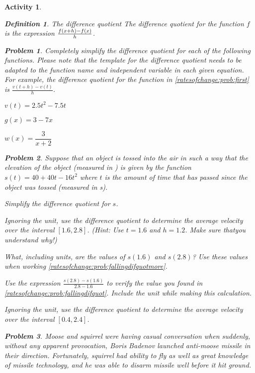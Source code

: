 \documentclass[12pt]{article}
\theoremstyle{activity}
\newtheorem{activity}{Activity}
\theoremstyle{problem}
\newtheorem{problem}{Problem}
\theoremstyle{example}
\theoremstyle{definition}
\newtheorem{definition}{Definition}
\theoremstyle{exercises}
\theoremstyle{exercise}
\begin{document}
\begin{activity}
\begin{definition}{The difference quotient}
The \emph{difference quotient} for the function $f$ is the expression $\frac{f\mleft(x+h\mright)-f(x)}{h}$.
\end{definition}
\begin{problem}
Completely simplify the difference quotient for each of the following functions. Please note that the template for the difference quotient needs to be adapted to the function name and independent variable in each given equation. For example, the difference quotient for the function in \cref{ratesofchange:prob:first} is $\frac{v(t+h)-v(t)}{h}$. 
\begin{parts}
\item \label{ratesofchange:prob:first} $v(t)= 2.5t^2-7.5t$
\item $g(x)=3-7x$
\item $w(x)=\dfrac{3}{x+2}$
\end{parts}
\end{problem}

\begin{problem}
Suppose that an object is tossed into the air in such a way that the elevation of the object (measured in \si{\foot}) is given by the function
$s(t)=40+40t-16t^2$ where $t$ is the amount of time that has passed since the object was tossed (measured in \si{\second}).
\begin{parts}
\item Simplify the difference quotient for $s$.
\item \label{ratesofchange:prob:fallingdifquot} Ignoring the unit, use the difference quotient to determine the average velocity over the interval $[1.6,2.8]$. (Hint: Use $t=1.6$ and
$h=1.2$. Make sure thatyou understand why!) 
\item What, \emph{including units}, are the values of $s(1.6)$ and $s(2.8)$? Use these values when working \cref{ratesofchange:prob:fallingdifquotmore}.
\item \label{ratesofchange:prob:fallingdifquotmore} Use the expression $\frac{s(2.8)-s(1.6)}{2.8-1.6}$ to verify the value you found in \cref{ratesofchange:prob:fallingdifquot}. \emph{Include the unit while making this calculation.}
\item Ignoring the unit, use the difference quotient to determine the average velocity over the interval $[0.4,2.4]$.
\end{parts}
\end{problem}

\begin{problem}
Moose and squirrel were having casual conversation when suddenly, without any apparent provocation, Boris Badenov launched anti-moose missile in their direction. Fortunately, squirrel had ability to fly as well as great knowledge of missile technology, and he was able to disarm missile well before it hit ground. 


\end{problem}
\end{activity}
\end{document}
